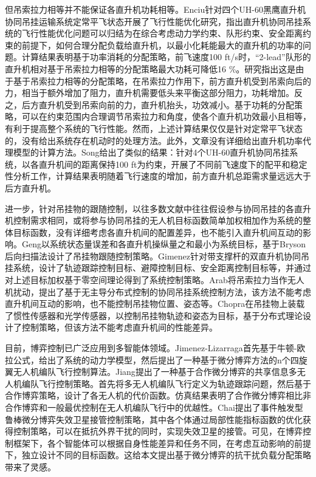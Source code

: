但吊索拉力相等并不能保证各直升机功耗相等。Enciu\cite{enciu2017flight}针对四个UH-60黑鹰直升机协同吊挂运输系统定常平飞状态开展了飞行性能优化研究，指出直升机协同吊挂系统的飞行性能优化问题可以归结为在综合考虑动力学约束、队形约束、安全距离约束的前提下，如何合理分配负载给直升机，以最小化耗能最大的直升机的功率的问题。计算结果表明基于功率消耗的分配策略，前飞速度100 ft/s时，“2-lead”队形的直升机相对基于吊索拉力相等的分配策略最大功耗可降低16 \%。研究指出这是由于基于吊索拉力相等的分配策略，在吊索拉力作用下，前方直升机受到吊索向后的力，相当于额外增加了阻力，直升机需要低头来平衡这部分阻力，功耗增加。反之，后方直升机受到吊索向前的力，直升机抬头，功效减小。基于功耗的分配策略，可以在约束范围内合理调节吊索拉力和角度，使各个直升机功效最小且相等，有利于提高整个系统的飞行性能。然而，上述计算结果仅仅是针对定常平飞状态的，没有给出系统存在机动时的处理方法。此外，文章没有详细给出直升机功率代理模型的计算方法。Song\cite{song2013modeling}给出了类似的结果：针对4个UH-60直升机协同吊挂系统，以各直升机间的距离保持100 ft为约束，开展了不同前飞速度下的配平和稳定性分析工作，计算结果表明随着飞行速度的增加，前方直升机总距需求量远远大于后方直升机。

进一步，针对吊挂物的跟随控制，以往多数文献中往往假设参与协同吊挂的各直升机控制需求相同，或将参与协同吊挂的无人机目标函数简单加权相加作为系统的整体目标函数，没有详细考虑各直升机间的配置差异，也不能引入直升机间互动的影响。Geng\cite{geng2020control,geng2021trajectory}以系统状态量误差和各直升机操纵量之和最小为系统目标，基于Bryson后向扫描法设计了吊挂物跟随控制策略。Gimenez\cite{gimenez2020control}针对带支撑杆的双直升机协同吊挂系统，设计了轨迹跟踪控制目标、避障控制目标、安全距离控制目标等，并通过对上述目标加权基于零空间理论得到了系统控制策略。Arab\cite{arab2021planning}将吊索拉力当作无人机扰动，提出了基于无主导分布式控制的协同吊挂系统控制方法，该方法不能考虑直升机间互动的影响，也不能控制吊挂物位置、姿态等。Chopra\cite{chopra2022distributed}在吊挂物上装载了惯性传感器和光学传感器，以控制吊挂物轨迹和姿态为目标，基于分布式理论设计了控制策略，但该方法不能考虑直升机间的性能差异。

目前，博弈控制已广泛应用到多智能体领域。Jimenez-Lizarraga\cite{jimenez2018differential}首先基于牛顿-欧拉公式，给出了系统的动力学模型，然后提出了一种基于微分博弈方法的n个四旋翼无人机编队飞行控制算法。Jiang\cite{jiang2020cooperative}提出了一种基于合作微分博弈的共享信息多无人机编队飞行控制策略。首先将多无人机编队飞行定义为轨迹跟踪问题，然后基于合作博弈策略，设计了各无人机的代价函数。仿真结果表明了合作微分博弈相比非合作博弈和一般最优控制在无人机编队飞行中的优越性。Chai\cite{chai2020robust}提出了事件触发型鲁棒微分博弈失效卫星接管控制策略，其中各个体通过局部性能指标函数的优化获得控制策略，可以在抵抗外界干扰的同时，实现失效卫星的接管。可见，在博弈控制框架下，各个智能体可以根据自身性能差异和任务不同，在考虑互动影响的前提下，独立设计不同的目标函数。这给本文提出基于微分博弈的抗干扰负载分配策略带来了灵感。

